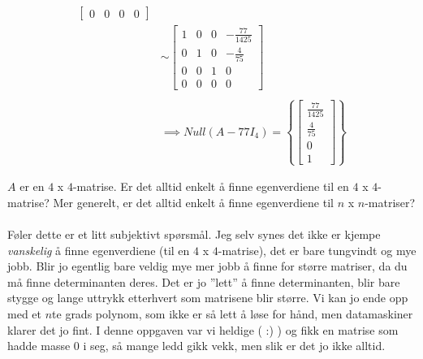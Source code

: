 \documentclass[11pt, a4paper, norsk]{NTNUoving}
\begin{document}
\begin{oppgave}
\begin{punkt}
\begin{align*}
\begin{bmatrix}
                    0 & 0 & 0 & 0
                \end{bmatrix}
                \\
                &\sim \begin{bmatrix}
                    1 & 0 & 0 & -\frac{77}{1425} \\
                    0 & 1 & 0 & -\frac{4}{75} \\
                    0 & 0 & 1 & 0 \\
                    0 & 0 & 0 & 0
                \end{bmatrix}
                \\
                \\
                &\implies Null(A - 77I_4) = \left\{\begin{bmatrix}
                    \frac{77}{1425} \\
                    \frac{4}{75} \\
                    0 \\
                    1
                \end{bmatrix}\right\}
            \end{align*}
        \end{punkt}
        \begin{punkt}
            $A$ er en $4$ x $4$-matrise. Er det alltid enkelt å finne egenverdiene til en $4$ x $4$-matrise? Mer generelt, er det alltid enkelt å finne egenverdiene til $n$ x $n$-matriser? 
            \\
            \\
            Føler dette er et litt subjektivt spørsmål. Jeg selv synes det ikke er kjempe \textit{vanskelig} å finne egenverdiene (til en $4$ x $4$-matrise), det er bare tungvindt og mye jobb. Blir jo egentlig bare veldig mye mer jobb å finne for større matriser, da du må finne determinanten deres. Det er jo ''lett'' å finne determinanten, blir bare stygge og lange uttrykk etterhvert som matrisene blir større. Vi kan jo ende opp med et $n$te grads polynom, som ikke er så lett å løse for hånd, men datamaskiner klarer det jo fint. I denne oppgaven var vi heldige ( :) ) og fikk en matrise som hadde masse $0$ i seg, så mange ledd gikk vekk, men slik er det jo ikke alltid. 
        \end{punkt}
    \end{oppgave}
\end{document}

